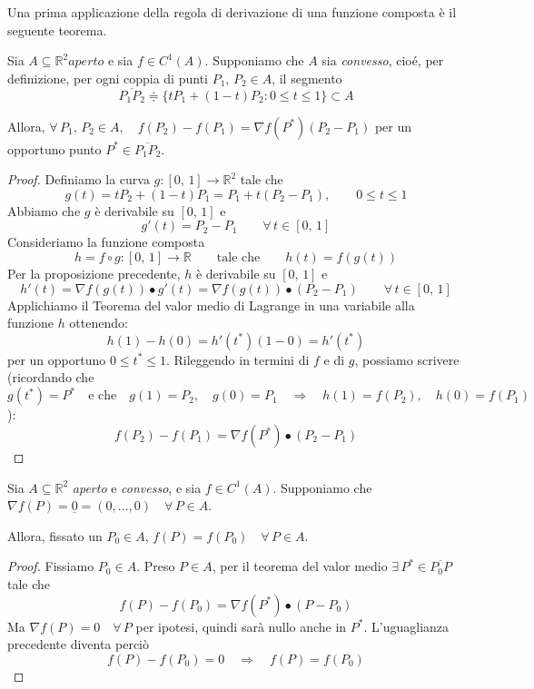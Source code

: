 Una prima applicazione della regola di derivazione di una funzione composta è il seguente teorema.

\begin{thm}
Sia $A \subseteq \mathbb{R}^2 aperto$ e sia $f \in C^1(A)$. Supponiamo che $A$ sia \emph{convesso}, cioé, per definizione, per ogni coppia di punti $P_1,\,P_2 \in A$, il segmento
$$\overline{P_1P_2} \doteqdot \lbrace tP_1+(1-t)P_2 : 0 \leq t \leq 1 \rbrace \subset A$$

\begin{center}
\def\svgwidth{8cm}

\end{center}

Allora, $\forall \, P_1,\,P_2 \in A, \quad f(P_2)-f(P_1) = \nabla f(P^*)(P_2-P_1)$ per un opportuno punto $P^* \in \overline{P_1P_2}$.
\end{thm}
\begin{proof}
Definiamo la curva $g:[0,\,1] \rightarrow \mathbb{R}^2$ tale che
$$
g(t) = tP_2 + (1-t)P_1 = P_1 + t(P_2-P_1), \qquad 0 \leq t \leq 1
$$
Abbiamo che $g$ è derivabile su $[0,\,1]$ e
$$
g'(t) = P_2-P_1 \qquad \forall \, t \in [0,\,1]
$$
Consideriamo la funzione composta
$$
h = f \circ g : [0,\,1] \rightarrow \mathbb{R} \qquad \text{tale che} \qquad h(t) = f(g(t))
$$
Per la proposizione precedente, $h$ è derivabile su $[0,\,1]$ e
$$
h'(t) = \nabla f(g(t)) \bullet g'(t) = \nabla f(g(t)) \bullet (P_2 - P_1) \qquad \forall \, t \in [0,\,1]
$$
Applichiamo il Teorema del valor medio di Lagrange in una variabile alla funzione $h$ ottenendo:
$$
h(1)-h(0) = h'(t^*)(1-0) = h'(t^*)
$$
per un opportuno $0 \leq t^* \leq 1$. Rileggendo in termini di $f$ e di $g$, possiamo scrivere (ricordando che $g(t^*) = P^* \quad \text{e che} \quad g(1)=P_2, \quad g(0) = P_1 \quad \Longrightarrow \quad h(1) = f(P_2), \quad h(0) = f(P_1)$):
$$
f(P_2) - f(P_1) = \nabla f(P^*) \bullet (P_2-P_1)
$$
\end{proof}

\begin{cor}
Sia $A \subseteq \mathbb{R}^2$ \emph{aperto} e \emph{convesso}, e sia $f \in C^1(A)$. Supponiamo che $\nabla f(P) = \underline{0} = (0,\ldots,0) \quad \forall \, P \in A$.

Allora, fissato un $P_0 \in A$, $f(P)=f(P_0) \quad \forall \, P \in A$.
\end{cor}
\begin{proof}
Fissiamo $P_0 \in A$. Preso $P \in A$, per il teorema del valor medio $\exists \, P^* \in \overline{P_0P}$ tale che
$$
f(P) - f(P_0) = \nabla f(P^*) \bullet (P-P_0)
$$
Ma $\nabla f(P) = 0 \quad \forall \, P$ per ipotesi, quindi sarà nullo anche in $P^*$. L'uguaglianza precedente diventa perciò
$$
f(P) - f(P_0) = 0 \quad \Longrightarrow \quad f(P) = f(P_0) 
$$ 
\end{proof}

